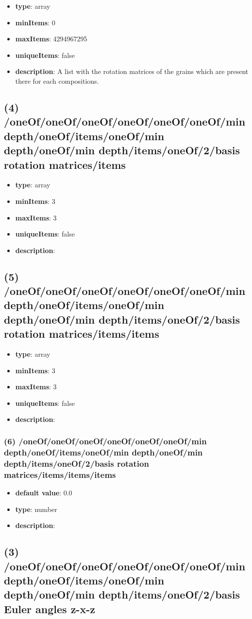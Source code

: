 \begin{itemize}[leftmargin=3em]\item {\bf type}: array
\item {\bf minItems}: 0
\item {\bf maxItems}: 4294967295
\item {\bf uniqueItems}: false
\item {\bf description}: A list with the rotation matrices of the grains which are present there for each compositions.
\end{itemize}\subsection{(4) /oneOf/oneOf/oneOf/oneOf/oneOf/oneOf/min depth/oneOf/items/oneOf/min depth/oneOf/min depth/items/oneOf/2/basis rotation matrices/items}
\begin{itemize}[leftmargin=4em]\item {\bf type}: array
\item {\bf minItems}: 3
\item {\bf maxItems}: 3
\item {\bf uniqueItems}: false
\item {\bf description}: 
\end{itemize}\subsection{(5) /oneOf/oneOf/oneOf/oneOf/oneOf/oneOf/min depth/oneOf/items/oneOf/min depth/oneOf/min depth/items/oneOf/2/basis rotation matrices/items/items}
\begin{itemize}[leftmargin=5em]\item {\bf type}: array
\item {\bf minItems}: 3
\item {\bf maxItems}: 3
\item {\bf uniqueItems}: false
\item {\bf description}: 
\end{itemize}\subsubsection{(6) /oneOf/oneOf/oneOf/oneOf/oneOf/oneOf/min depth/oneOf/items/oneOf/min depth/oneOf/min depth/items/oneOf/2/basis rotation matrices/items/items/items}
\begin{itemize}[leftmargin=6em]\item {\bf default value}: 0.0
\item {\bf type}: number
\item {\bf description}: 
\end{itemize}\subsection{(3) /oneOf/oneOf/oneOf/oneOf/oneOf/oneOf/min depth/oneOf/items/oneOf/min depth/oneOf/min depth/items/oneOf/2/basis Euler angles z-x-z}
